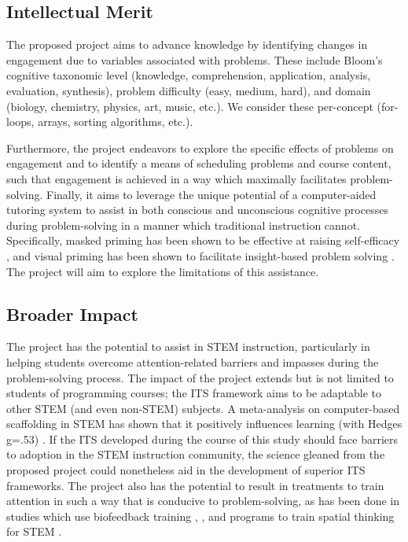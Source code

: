 \documentclass[hidelinks,11pt]{article}
\begin{document}
\subsection{ Intellectual Merit }

The proposed project aims to advance knowledge by identifying changes in
engagement due to variables associated with problems.  These include Bloom's
cognitive taxonomic level (knowledge, comprehension, application, analysis,
evaluation, synthesis), problem difficulty (easy, medium, hard), and domain
(biology, chemistry, physics, art, music, etc.).  We consider these per-concept
(for-loops, arrays, sorting algorithms, etc.).

Furthermore, the project endeavors to explore the specific effects of problems
on engagement and to identify a means of scheduling problems and course
content, such that engagement is achieved in a way which maximally facilitates
problem-solving. Finally, it aims to leverage the unique potential of a
computer-aided tutoring system to assist in both conscious and unconscious
cognitive processes during problem-solving in a manner which traditional
instruction cannot. Specifically, masked priming has been shown to be effective
at raising self-efficacy \cite{jraidi2011}, and visual priming has been shown
to facilitate insight-based problem solving \cite{grant2003}.  The project will
aim to explore the limitations of this assistance.

\subsection{ Broader Impact }

The project has the potential to assist in STEM instruction, particularly in
helping students overcome attention-related barriers and impasses during the
problem-solving process. The impact of the project extends but is not limited
to students of programming courses; the ITS framework aims to be adaptable to
other STEM (and even non-STEM) subjects.  A meta-analysis on computer-based
scaffolding in STEM has shown that it positively influences learning (with
Hedges g=.53) \cite{belland2015}.  If the ITS developed during the course of
this study should face barriers to adoption in the STEM instruction community,
the science gleaned from the proposed project could nonetheless aid in the
development of superior ITS frameworks.  The project also has the potential to
result in treatments to train attention in such a way that is conducive to
problem-solving, as has been done in studies which use biofeedback training
\cite{li2009}, \cite{li2011}, and programs to train spatial thinking for
STEM \cite{taylor2013}.
\end{document}
